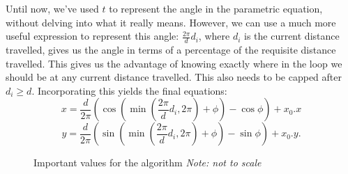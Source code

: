 \documentclass[twocolumn,11pt]{article}
\begin{document}
Until now, we've used $t$ to represent the angle in the parametric equation,
without delving into what it really means. However, we can use a much more
useful expression to represent this angle: $\frac{2\pi}{d}d_i$, where $d_i$ is
the current distance travelled, gives us the
angle in terms of a percentage of the requisite distance travelled. This gives
us the advantage of knowing exactly where in the loop we should be at any
current distance travelled. This also needs to be capped after $d_i \geq d$.
Incorporating this yields the final equations:
\[ x = \frac{d}{2\pi}(\cos (\min(\frac{2\pi}{d}d_i,2\pi) + \phi) - \cos \phi) + x_0.x \]
\[ y = \frac{d}{2\pi}(\sin (\min(\frac{2\pi}{d}d_i,2\pi) + \phi) - \sin \phi)+ x_0.y. \]

\begin{figure}
  \centering
  \caption{Important values for the algorithm \emph{Note: not to scale}}
  \label{fig:algvals}
\end{figure}
\end{document}
